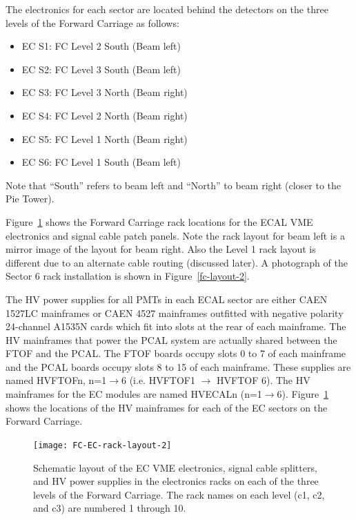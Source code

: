 \documentclass[letterpaper,10pt]{article}
\begin{document}
The electronics for each sector are located behind the detectors on the three levels of the Forward 
Carriage as follows:

\vskip 0.5cm

\begin{minipage}{0.5\textwidth}
\begin{itemize}
\item EC S1: FC Level 2 South (Beam left)
\item EC S2: FC Level 3 South (Beam left)
\item EC S3: FC Level 3 North (Beam right)
\end{itemize}
\end{minipage}
\begin{minipage}{0.5\textwidth}
\begin{itemize}
\item EC S4: FC Level 2 North (Beam right)
\item EC S5: FC Level 1 North (Beam right)
\item EC S6: FC Level 1 South (Beam left)
\end{itemize}
\end{minipage}

\vskip 0.5cm

Note that ``South'' refers to beam left and ``North'' to beam right (closer to the Pie Tower).

Figure~\ref{fc-layout-1} shows the Forward Carriage rack locations for the ECAL VME electronics and signal cable patch 
panels.  Note the rack layout for beam left is a mirror image of the layout for beam right.  Also the Level 1 rack layout
is different due to an alternate cable routing (discussed later).  A photograph of the Sector 6 rack installation is
shown in Figure~\ref{fc-layout-2}.

The HV power supplies for all PMTs in each ECAL sector are either CAEN 1527LC mainframes or CAEN 4527 mainframes 
outfitted with negative polarity 24-channel A1535N cards which fit into slots at the rear of each
mainframe. The HV mainframes that power the PCAL 
system are actually shared between the FTOF and the PCAL. The FTOF boards occupy slots 0 to 7 of each 
mainframe and the PCAL boards occupy slots 8 to 15 of each mainframe. These supplies are named HVFTOFn, 
n=1$\to$6 (i.e. HVFTOF1 $\to$ HVFTOF 6). The HV mainframes for the EC modules are named HVECALn (n=1$\to$6).
Figure~\ref{fc-layout-1} shows the locations of the HV mainframes for each of the EC sectors on the Forward Carriage.


\begin{figure}[htbp]
  \centering
  \texttt{[image: FC-EC-rack-layout-2]}
  \vspace{2mm}
  \caption{Schematic layout of the EC VME electronics, signal cable splitters, and HV power 
  supplies in the electronics racks on each of the three levels of the Forward Carriage. The rack names on each level (c1, c2,
  and c3) are numbered 1 through 10.}
  \label{fc-layout-1} 
\end{figure}
\end{document}
